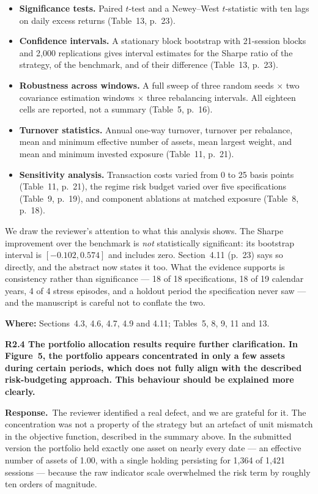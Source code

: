 \documentclass[11pt,a4paper]{article}
\newcommand{\rc}[1]{\par\medskip\noindent\textbf{#1}\par\nopagebreak}
\newcommand{\resp}{\par\noindent\textbf{Response.}\ }
\newcommand{\where}[1]{\par\smallskip\noindent\textcolor{blue!55!black}{\textbf{Where:} #1}\par}
\begin{document}
\begin{itemize}
\item \textbf{Significance tests.} Paired $t$-test and a Newey--West $t$-statistic with
ten lags on daily excess returns (Table~13, p.~23).
\item \textbf{Confidence intervals.} A stationary block bootstrap with 21-session blocks
and 2{,}000 replications gives interval estimates for the Sharpe ratio of the strategy,
of the benchmark, and of their difference (Table~13, p.~23).
\item \textbf{Robustness across windows.} A full sweep of three random seeds $\times$ two
covariance estimation windows $\times$ three rebalancing intervals. All eighteen cells
are reported, not a summary (Table~5, p.~16).
\item \textbf{Turnover statistics.} Annual one-way turnover, turnover per rebalance,
mean and minimum effective number of assets, mean largest weight, and mean and minimum
invested exposure (Table~11, p.~21).
\item \textbf{Sensitivity analysis.} Transaction costs varied from 0 to 25 basis points
(Table~11, p.~21), the regime risk budget varied over five specifications (Table~9,
p.~19), and component ablations at matched exposure (Table~8, p.~18).
\end{itemize}

We draw the reviewer's attention to what this analysis shows. The Sharpe improvement
over the benchmark is \emph{not} statistically significant: its bootstrap interval is
$[-0.102, 0.574]$ and includes zero. Section~4.11 (p.~23) says so directly, and the
abstract now states it too. What the evidence supports is consistency rather than
significance --- 18 of 18 specifications, 18 of 19 calendar years, 4 of 4 stress
episodes, and a holdout period the specification never saw --- and the manuscript is
careful not to conflate the two.
\where{Sections~4.3, 4.6, 4.7, 4.9 and 4.11; Tables~5, 8, 9, 11 and 13.}

\rc{R2.4 The portfolio allocation results require further clarification. In Figure~5,
the portfolio appears concentrated in only a few assets during certain periods, which
does not fully align with the described risk-budgeting approach. This behaviour should
be explained more clearly.}

\resp The reviewer identified a real defect, and we are grateful for it. The
concentration was not a property of the strategy but an artefact of unit mismatch in the
objective function, described in the summary above. In the submitted version the
portfolio held exactly one asset on nearly every date --- an effective number of assets
of 1.00, with a single holding persisting for 1{,}364 of 1{,}421 sessions --- because the
raw indicator scale overwhelmed the risk term by roughly ten orders of magnitude.
\end{document}

